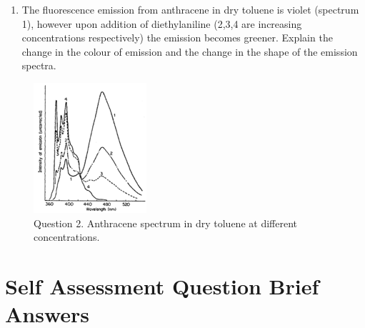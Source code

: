 \documentclass[
]{book}
\providecommand{\tightlist}{%
  \setlength{\itemsep}{0pt}\setlength{\parskip}{0pt}}
\begin{document}
\begin{enumerate}
\def\labelenumi{\arabic{enumi}.}
\setcounter{enumi}{1}
\tightlist
\item
  The fluorescence emission from anthracene in dry toluene is violet (spectrum 1), however upon addition of diethylaniline (2,3,4 are increasing concentrations respectively) the emission becomes greener. Explain the change in the colour of emission and the change in the shape of the emission spectra.
\end{enumerate}

\begin{figure}

{\centering \includegraphics[width=0.7\linewidth]{images/pyrenespec} 

}

\caption{Question 2. Anthracene spectrum in dry toluene at different concentrations.}\label{fig:anthracenespec}
\end{figure}

\hypertarget{self-assessment-question-brief-answers}{%
\section{Self Assessment Question Brief Answers}\label{self-assessment-question-brief-answers}}
\end{document}

